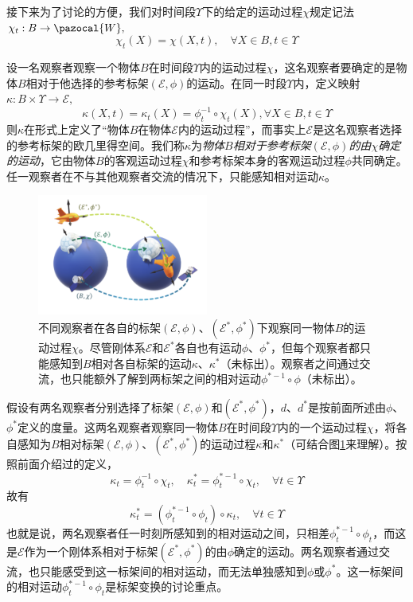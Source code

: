 \documentclass[main.tex]{subfiles}
\begin{document}
接下来为了讨论的方便，我们对时间段$\Upsilon$下的给定的运动过程$\chi$规定记法$\chi_t:B\rightarrow\pazocal{W},$
\[\chi_t\left(X\right)=\chi\left(X,t\right),\quad\forall X\in B,t\in\Upsilon\]

设一名观察者观察一个物体$B$在时间段$\Upsilon$内的运动过程$\chi$，这名观察者要确定的是物体$B$相对于他选择的参考标架$\left(\mathcal{E},\phi\right)$的运动。在同一时段$\Upsilon$内，定义映射$\kappa:B\times\Upsilon\rightarrow\mathcal{E},$
\[\kappa\left(X,t\right)=\kappa_t\left(X\right)=\phi_t^{-1}\circ\chi_t\left(X\right),\forall X\in B, t\in\Upsilon\]
则$\kappa$在形式上定义了“物体$B$在物体$\mathcal{E}$内的运动过程”，而事实上$\mathcal{E}$是这名观察者选择的参考标架的欧几里得空间。我们称$\kappa$为\emph{物体$B$相对于参考标架$\left(\mathcal{E},\phi\right)$的由$\chi$确定的运动}，它由物体$B$的客观运动过程$\chi$和参考标架本身的客观运动过程$\phi$共同确定。任一观察者在不与其他观察者交流的情况下，只能感知相对运动$\kappa$。

\begin{figure}[ht]
    \centering
    \includegraphics[width=0.5\textwidth]{images/III.5.3.pdf}
    \caption{不同观察者在各自的标架$\left(\mathcal{E},\phi\right)$、$\left(\mathcal{E}^*,\phi^*\right)$下观察同一物体$B$的运动过程$\chi$。尽管刚体系$\mathcal{E}$和$\mathcal{E}^*$各自也有运动$\phi$、$\phi^*$，但每个观察者都只能感知到$B$相对各自标架的运动$\kappa$、$\kappa^*$（未标出）。观察者之间通过交流，也只能额外了解到两标架之间的相对运动$\phi^{*-1}\circ\phi$（未标出）。}
    \label{fig:III.5.3}
\end{figure}

假设有两名观察者分别选择了标架$\left(\mathcal{E},\phi\right)$和$\left(\mathcal{E}^*,\phi^*\right)$，$d$、$d^*$是按前面所述由$\phi$、$\phi^*$定义的度量。这两名观察者观察同一物体$B$在时间段$\Upsilon$内的一个运动过程$\chi$，将各自感知为$B$相对标架$\left(\mathcal{E},\phi\right)$、$\left(\mathcal{E}^*,\phi^*\right)$的运动过程$\kappa$和$\kappa^*$（可结合图\ref{fig:III.5.3}来理解）。按照前面介绍过的定义，
\[\kappa_t=\phi_t^{-1}\circ\chi_t,\quad\kappa_t^*=\phi_t^{*-1}\circ \chi_t,\quad\forall t\in\Upsilon\]
故有
\[\kappa_t^*=\left(\phi_t^{*-1}\circ\phi_t\right)\circ\kappa_t,\quad\forall t\in\Upsilon\]
也就是说，两名观察者任一时刻所感知到的相对运动之间，只相差$\phi_t^{*-1}\circ\phi_t$，而这是$\mathcal{E}$作为一个刚体系相对于标架$\left(\mathcal{E}^*,\phi^*\right)$的由$\phi$确定的运动。两名观察者通过交流，也只能感受到这一标架间的相对运动，而无法单独感知到$\phi$或$\phi^*$。这一标架间的相对运动$\phi_t^{*-1}\circ\phi_t$是标架变换的讨论重点。
\end{document}

